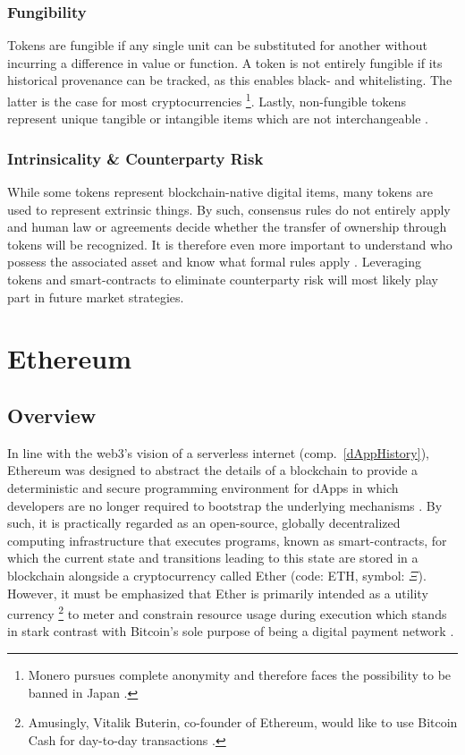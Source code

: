 \subsubsection{Fungibility}
\label{sec:fungibility}
Tokens are fungible if any single unit can be substituted for another without incurring a difference in value or function. A token is not entirely fungible if its historical provenance can be tracked, as this enables black- and whitelisting. The latter is the case for most cryptocurrencies \footnote{Monero pursues complete anonymity and therefore faces the possibility to be banned in Japan \cite{monero}.}. Lastly, non-fungible tokens represent unique tangible or intangible items which are not interchangeable \cite[p.~175]{Antonopoulos.2018}.

\subsubsection{Intrinsicality \& Counterparty Risk}
While some tokens represent blockchain-native digital items, many tokens are used to represent extrinsic things. By such, consensus rules do not entirely apply and human law or agreements decide whether the transfer of ownership through tokens will be recognized. It is therefore even more important to understand who possess the associated asset and know what formal rules apply \cite[pp.~175--176]{Antonopoulos.2018}. Leveraging tokens and smart-contracts to eliminate counterparty risk will most likely play part in future market strategies.

\pagebreak

\section{Ethereum}
\subsection{Overview}
\label{sec:ethereumOverview}
In line with the web3's vision of a serverless internet (comp.~\ref{dAppHistory}), Ethereum was designed to abstract the details of a blockchain to provide a deterministic and secure programming environment for \acp{dApp} in which developers  are no longer required to bootstrap the underlying mechanisms \cite[p.~27]{Antonopoulos.2018}. By such, it is practically regarded as an open-source, globally decentralized computing infrastructure that executes programs, known as smart-contracts, for which the current state and transitions leading to this state are stored in a blockchain alongside a cryptocurrency called Ether (code: ETH, symbol: $\mathsf{\Xi}$). However, it must be emphasized that Ether is primarily intended as a utility currency \footnote{Amusingly, Vitalik Buterin, co-founder of Ethereum, would like to use Bitcoin Cash for day-to-day transactions \cite{forbes2018}.} to meter and constrain resource usage during execution which stands in stark contrast with Bitcoin's sole purpose of being a digital payment network \cite[p.~23]{Antonopoulos.2018} \cite[p.~1]{bitcoin}.

